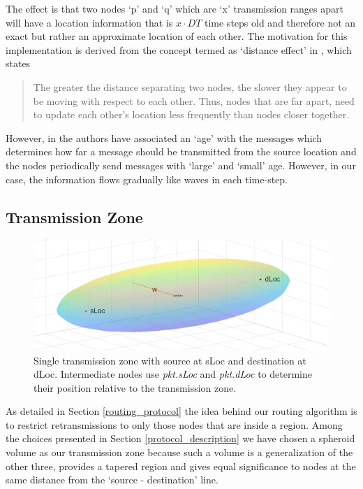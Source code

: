 The effect is that two nodes `p' and `q' which are `x' transmission ranges apart will have a location information that is $x \cdot DT $ time steps old and therefore not an exact but rather an approximate location of each other. The motivation for this implementation is derived from the concept termed as `distance effect' in \cite{Basagni:1998:DRE:288235.288254}, which states
\begin{quotation}
The greater the distance separating two nodes, the slower they appear to be moving with respect to each other. Thus, nodes that are far apart, need to update each other's location less frequently than nodes closer together.
\end{quotation}
However, in \cite{Basagni:1998:DRE:288235.288254} the authors have associated an `age' with the messages which determines how far a message should be transmitted from the source location and the nodes periodically send messages with `large' and `small' age. However, in our case, the information flows gradually like waves in each time-step.

\subsection{Transmission Zone}
\label{transmission_zone}
\begin{figure}[hbtp]
\centering
\includegraphics[width=1\textwidth]{Chapter-4/figs/Spheroid}
\caption{Single transmission zone with source at sLoc and destination at dLoc. Intermediate nodes use \emph{pkt.sLoc} and \emph{pkt.dLoc} to determine their position relative to the transmission zone.}
\label{fig:spheroid}
\end{figure}

As detailed in Section \ref{routing_protocol} the idea behind our routing algorithm is to restrict retransmissions to only those nodes that are inside a region. Among the choices presented in Section \ref{protocol_description} we have chosen a spheroid volume as our transmission zone because such a volume is a generalization of the other three, provides a tapered region and gives equal significance to nodes at the same distance from the `source - destination' line. 

